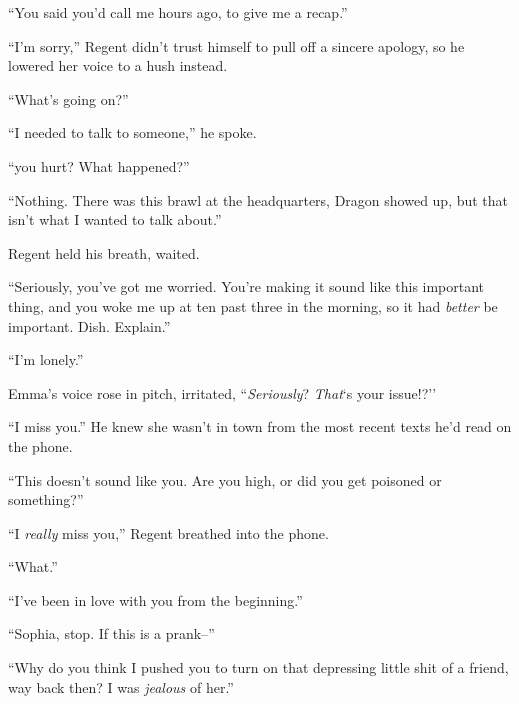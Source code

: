 ``You said you'd call me hours ago, to give me a recap.''



``I'm sorry,'' Regent didn't trust himself to pull off a sincere apology, so he lowered her voice to a hush instead.



``What's going on?''



``I needed to talk to someone,'' he spoke.



``\ldotsAre you hurt?  What happened?''



``Nothing.  There was this brawl at the headquarters, Dragon showed up, but that isn't what I wanted to talk about.''



Regent held his breath, waited.



``Seriously, you've got me worried.  You're making it sound like this important thing, and you woke me up at ten past three in the morning, so it had \emph{better} be important.  Dish.  Explain.''



``I'm lonely.''



Emma's voice rose in pitch, irritated, ``\emph{Seriously}?  \emph{That}`s your issue!?''



``I miss you.''  He knew she wasn't in town from the most recent texts he'd read on the phone.



``This doesn't sound like you.  Are you high, or did you get poisoned or something?''



``I \emph{really} miss you,'' Regent breathed into the phone.



``What.''



``I've been in love with you from the beginning.''



``Sophia, stop.  If this is a prank--''



``Why do you think I pushed you to turn on that depressing little shit of a friend, way back then?  I was \emph{jealous} of her.''



